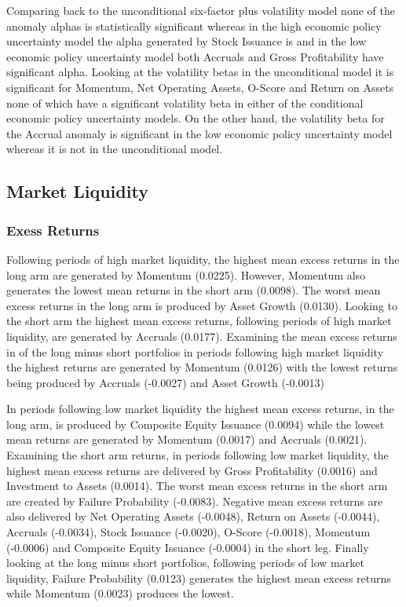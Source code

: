 \documentclass[a4paper]{article}                 %
\begin{document}
Comparing back to the unconditional six-factor plus volatility model none of the anomaly alphas is statistically significant whereas in the high economic policy uncertainty model the alpha generated by Stock Issuance is and in the low economic policy uncertainty model both Accruals and Gross Profitability have significant alpha. Looking at the volatility betas in the unconditional model it is significant for Momentum, Net Operating Assets, O-Score and Return on Assets none of which have a significant volatility beta in either of the conditional economic policy uncertainty models. On the other hand, the volatility beta for the Accrual anomaly is significant in the low economic policy uncertainty model whereas it is not in the unconditional model.


\subsection{Market Liquidity}
\subsubsection{Exess Returns}
Following periods of high market liquidity, the highest mean excess returns in the long arm are generated by Momentum (0.0225). However, Momentum also generates the lowest mean returns in the short arm (0.0098). The worst mean excess returns in the long arm is produced by Asset Growth (0.0130). Looking to the short arm the highest mean excess returns, following periods of high market liquidity, are generated by Accruals (0.0177). Examining the mean excess returns in of the long minus short portfolios in periods following high market liquidity the highest returns are generated by Momentum (0.0126) with the lowest returns being produced by Accruals (-0.0027) and Asset Growth (-0.0013)

In periods following low market liquidity the highest mean excess returns, in the long arm, is produced by Composite Equity Issuance (0.0094) while the lowest mean returns are generated by Momentum (0.0017) and Accruals (0.0021). Examining the short arm returns, in periods following low market liquidity, the highest mean excess returns are delivered by Gross Profitability (0.0016) and Investment to Assets (0.0014). The worst mean excess returns in the short arm are created by Failure Probability (-0.0083). Negative mean excess returns are also delivered by Net Operating Assets (-0.0048), Return on Assets (-0.0044), Accruals (-0.0034), Stock Issuance (-0.0020), O-Score (-0.0018), Momentum (-0.0006) and Composite Equity Issuance (-0.0004) in the short leg. Finally looking at the long minus short portfolios, following periods of low market liquidity, Failure Probability (0.0123) generates the highest mean excess returns while Momentum (0.0023) produces the lowest.
\end{document}
